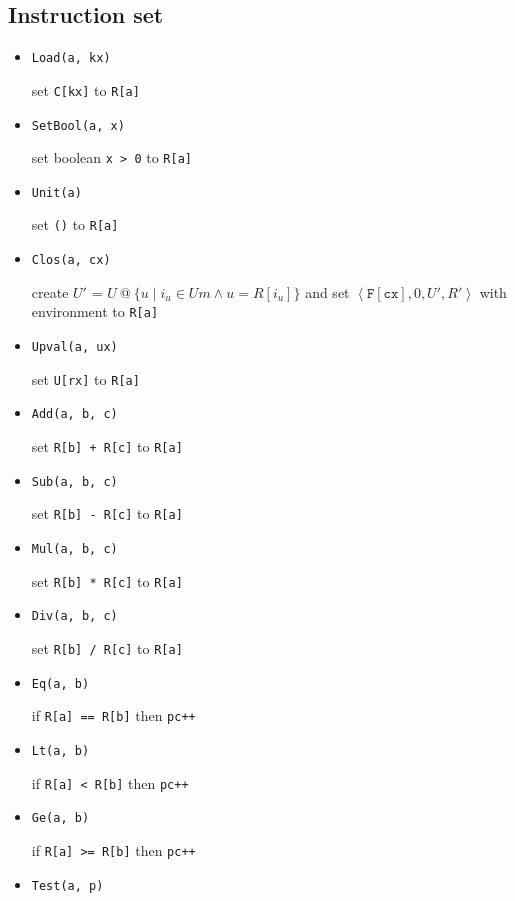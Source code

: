 \documentclass{article}
\begin{document}
\subsection{Instruction set}
\begin{multicols}{2}
    \begin{itemize}
        \item \texttt{Load(a, kx)}

            set \texttt{C[kx]} to \texttt{R[a]}
        \item \texttt{SetBool(a, x)}

            set boolean \texttt{x > 0} to \texttt{R[a]}
        \item \texttt{Unit(a)}

            set \texttt{()} to \texttt{R[a]}
        \item \texttt{Clos(a, cx)}

            create $U'$ = $U\ @\ \{u \mid i_u \in Um \wedge u = R[i_u]\}$
            and set $\left\langle \mathtt{F[cx]}, 0, U', R'\right\rangle$ with environment to \texttt{R[a]}
        \item \texttt{Upval(a, ux)}

            set \texttt{U[rx]} to \texttt{R[a]}
        \item \texttt{Add(a, b, c)}

            set \texttt{R[b] + R[c]} to \texttt{R[a]}
        \item \texttt{Sub(a, b, c)}

            set \texttt{R[b] - R[c]} to \texttt{R[a]}
        \item \texttt{Mul(a, b, c)}

            set \texttt{R[b] * R[c]} to \texttt{R[a]}
        \item \texttt{Div(a, b, c)}

            set \texttt{R[b] / R[c]} to \texttt{R[a]}
        \item \texttt{Eq(a, b)}

            if \texttt{R[a] == R[b]} then \texttt{pc++}
        \item \texttt{Lt(a, b)}

            if \texttt{R[a] < R[b]} then \texttt{pc++}
        \item \texttt{Ge(a, b)}

            if \texttt{R[a] >= R[b]} then \texttt{pc++}

        \item \texttt{Test(a, p)}


\end{itemize}
\end{multicols}
\end{document}

